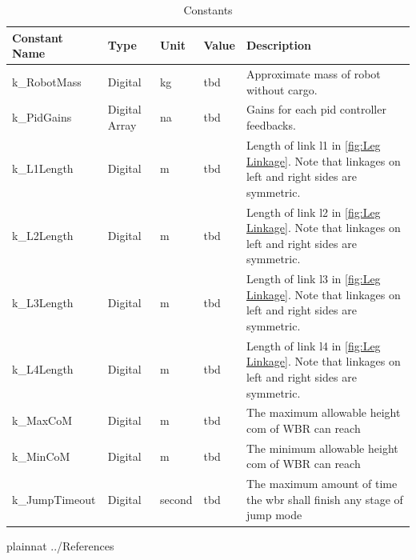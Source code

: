 \documentclass[12pt]{article}
\begin{document}
\begin{table}[H]
    \caption{Constants}
    \begin{tabularx}{\textwidth}{|p{3cm}|p{1.5cm}|p{1.25cm}|p{1cm}|X|}
        \toprule
        \textbf{Constant Name} & \textbf{Type} & \textbf{Unit} & \textbf{Value} & \textbf{Description}                                                                                  \\
        \midrule
        k\_RobotMass           & Digital       & \si{kg}       & \acrshort{tbd} & Approximate mass of robot without cargo.                                                              \\
        k\_PidGains            & Digital Array & \acrshort{na} & \acrshort{tbd} & Gains for each \acrshort{pid} controller feedbacks.                                                   \\
        k\_L1Length            & Digital       & \si{m}        & \acrshort{tbd} & Length of link l1 in \ref{fig:Leg Linkage}. Note that linkages on left and right sides are symmetric. \\
        k\_L2Length            & Digital       & \si{m}        & \acrshort{tbd} & Length of link l2 in \ref{fig:Leg Linkage}. Note that linkages on left and right sides are symmetric. \\
        k\_L3Length            & Digital       & \si{m}        & \acrshort{tbd} & Length of link l3 in \ref{fig:Leg Linkage}. Note that linkages on left and right sides are symmetric. \\
        k\_L4Length            & Digital       & \si{m}        & \acrshort{tbd} & Length of link l4 in \ref{fig:Leg Linkage}. Note that linkages on left and right sides are symmetric. \\
        k\_MaxCoM              & Digital       & \si{m}        & \acrshort{tbd} & The maximum allowable height \acrshort{com} of WBR can reach                                          \\
        k\_MinCoM              & Digital       & \si{m}        & \acrshort{tbd} & The minimum allowable height \acrshort{com} of WBR can reach                                          \\
        k\_JumpTimeout         & Digital       & \si{second}   & \acrshort{tbd} & The maximum amount of time the \acrshort{wbr} shall finish any stage of jump mode                     \\
        \bottomrule
    \end{tabularx}
\end{table}

\newpage
 {plainnat}
 {../References}
\end{document}

